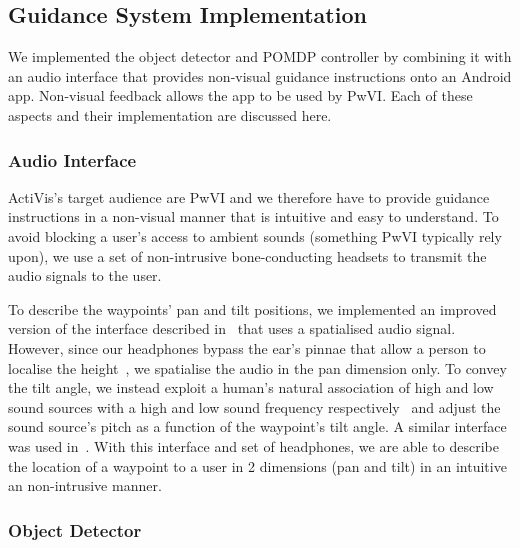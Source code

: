 \documentclass[runningheads]{llncs}
\begin{document}
\subsection{Guidance System Implementation}

We implemented the object detector and POMDP controller by combining it with an audio interface that provides non-visual guidance instructions onto an Android app.%
Non-visual feedback allows the app to be used by PwVI.
Each of these aspects and their implementation are discussed here.

\subsubsection{Audio Interface}

ActiVis's target audience are PwVI and we therefore have to provide guidance instructions in a non-visual manner that is intuitive and easy to understand. 
To avoid blocking a user's access to ambient sounds (something PwVI typically rely upon), we use a set of non-intrusive bone-conducting headsets to transmit the audio signals to the user. 

To describe the waypoints' pan and tilt positions, we implemented an improved version of the interface described in~\cite{bellotto2013} that uses a spatialised audio signal.
However, since our headphones bypass the ear's pinnae that allow a person to localise the height~\cite{roffler1968factors}, we spatialise the audio in the pan dimension only.
To convey the tilt angle, we instead exploit a human's natural association of high and low sound sources with a high and low sound frequency respectively~\cite{blauert1997spatial} and adjust the sound source's pitch as a function of the waypoint's tilt angle. 
A similar interface was used in~\cite{schauerte2012assistive}.
With this interface and set of headphones, we are able to describe the location of a waypoint to a user in 2 dimensions (pan and tilt) in an intuitive an non-intrusive manner. 

\subsubsection{Object Detector}
\end{document}
